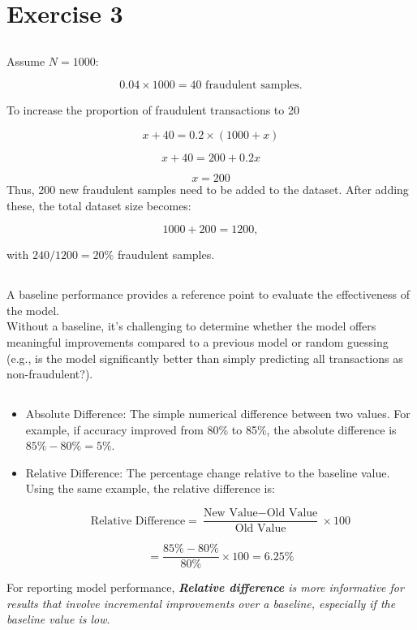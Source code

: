 \documentclass[12pt]{article}
\begin{document}
	\section{Exercise 3}
	\subsection{}	
	Assume \( N = 1000 \):
	
	\[
	0.04 \times 1000 = 40 \text{ fraudulent samples.}
	\]
	
	To increase the proportion of fraudulent transactions to 20%
	
	\[
	x + 40 = 0.2\times (1000 + x) 
	\]
	
	\[
	x + 40 = 200 + 0.2 x
	\]

	\[
	x = 200
	\]	
	Thus, 200 new fraudulent samples need to be added to the dataset. After adding these, the total dataset size becomes:
	
	\[
	1000 + 200 = 1200,
	\]
	
	with \( 240/1200 = 20\% \) fraudulent samples.
	
	\subsection{}	
	A baseline performance provides a reference point to evaluate the effectiveness of the model.\\
	Without a baseline, it’s challenging to determine whether the model offers meaningful improvements compared to a previous model or random guessing (e.g., is the model significantly better than simply predicting all transactions as non-fraudulent?).
	\subsection{}	

	\begin{itemize}
		\item Absolute Difference: The simple numerical difference between two values. For example, if accuracy improved from 80\% to 85\%, the absolute difference is \( 85\% - 80\% = 5\% \).
	
		\item Relative Difference: The percentage change relative to the baseline value. Using the same example, the relative difference is:
	
		\[
		\text{Relative Difference} = \frac{\text{New Value} - \text{Old Value}}{\text{Old 	Value}} \times 100
		\]
		
		\[
		= \frac{85\% - 80\%}{80\%} \times 100 = 6.25\%
		\]
	\end{itemize}

	For reporting model performance, \emph{\textbf{Relative difference} is more informative for results that involve incremental improvements over a baseline, especially if the baseline value is low}.
\end{document}
